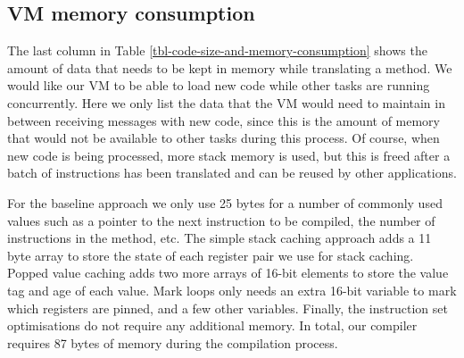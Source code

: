 \subsection{VM memory consumption}
The last column in Table \ref{tbl-code-size-and-memory-consumption} shows the amount of data that needs to be kept in memory while translating a method. We would like our VM to be able to load new code while other tasks are running concurrently. Here we only list the data that the VM would need to maintain in between receiving messages with new code, since this is the amount of memory that would not be available to other tasks during this process. Of course, when new code is being processed, more stack memory is used, but this is freed after a batch of instructions has been translated and can be reused by other applications.

For the baseline approach we only use 25 bytes for a number of commonly used values such as a pointer to the next instruction to be compiled, the number of instructions in the method, etc. The simple stack caching approach adds a 11 byte array to store the state of each register pair we use for stack caching. Popped value caching adds two more arrays of 16-bit elements to store the value tag and age of each value. Mark loops only needs an extra 16-bit variable to mark which registers are pinned, and a few other variables. Finally, the instruction set optimisations do not require any additional memory. In total, our compiler requires 87 bytes of memory during the compilation process.

